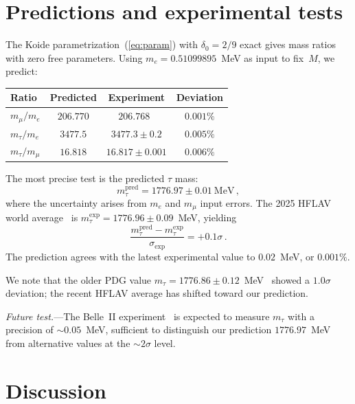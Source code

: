\documentclass[aps,prl,twocolumn,superscriptaddress]{revtex4-2}
\begin{document}
\section{Predictions and experimental tests}

The Koide parametrization~(\ref{eq:param}) with $\delta_0 = 2/9$ exact gives mass ratios
with zero free parameters. Using $m_e = 0.51099895$~MeV as input to fix~$M$, we predict:

\begin{center}
\begin{tabular}{lccc}
\hline\hline
Ratio & Predicted & Experiment & Deviation \\
\hline
$m_\mu/m_e$ & $206.770$ & $206.768$~\cite{PDG2024} & $0.001\%$ \\
$m_\tau/m_e$ & $3477.5$ & $3477.3 \pm 0.2$ & $0.005\%$ \\
$m_\tau/m_\mu$ & $16.818$ & $16.817 \pm 0.001$ & $0.006\%$ \\
\hline\hline
\end{tabular}
\end{center}

The most precise test is the predicted $\tau$ mass:
\begin{equation}
m_\tau^{\text{pred}} = 1776.97 \pm 0.01~\text{MeV}\,,
\label{eq:mtau}
\end{equation}
where the uncertainty arises from $m_e$ and $m_\mu$ input errors. The 2025 HFLAV world
average~\cite{HFLAV2025} is $m_\tau^{\text{exp}} = 1776.96 \pm 0.09$~MeV, yielding
\begin{equation}
\frac{m_\tau^{\text{pred}} - m_\tau^{\text{exp}}}{\sigma_{\text{exp}}} = +0.1\sigma\,.
\end{equation}
The prediction agrees with the latest experimental value to $0.02$~MeV, or $0.001\%$.

We note that the older PDG value $m_\tau = 1776.86 \pm 0.12$~MeV~\cite{PDG2024} showed
a $1.0\sigma$ deviation; the recent HFLAV average has shifted toward our prediction.

\emph{Future test.}---The Belle~II experiment~\cite{BelleII2023} is expected to measure
$m_\tau$ with a precision of $\sim 0.05$~MeV, sufficient to distinguish our prediction
$1776.97$~MeV from alternative values at the $\sim 2\sigma$ level.

\section{Discussion}
\end{document}
